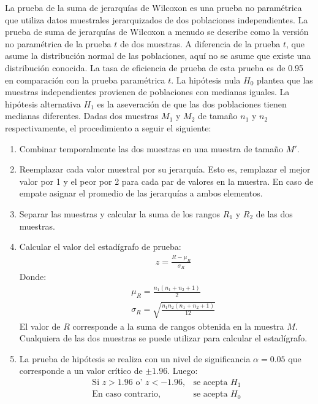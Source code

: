 La prueba de la suma de jerarquías de Wilcoxon es una prueba no paramétrica que utiliza  datos muestrales jerarquizados de dos poblaciones independientes. La prueba de suma de jerarquías de Wilcoxon a menudo se describe como la versión no paramétrica de la prueba $t$ de dos muestras. A diferencia de la prueba $t$, que asume la distribución normal de las poblaciones, aquí no se asume que existe una distribución conocida. La tasa de eficiencia de prueba de esta prueba es de 0.95 en comparación con la prueba paramétrica $t$. La hipótesis nula $H_0$ plantea que las muestras independientes provienen de poblaciones con medianas iguales. La hipótesis alternativa $H_1$ es la aseveración de que las dos poblaciones tienen medianas diferentes. Dadas dos muestras $M_1$ y $M_2$ de tamaño $n_1$ y $n_2$ respectivamente, el procedimiento a seguir el siguiente:
\begin{enumerate}
	\item Combinar temporalmente las dos muestras  en una muestra de tamaño $M'$.
	\item Reemplazar cada valor muestral por su jerarquía. Esto es, remplazar el mejor valor por 1 y el peor por 2 para cada par de valores en la muestra. En caso de empate asignar el promedio de las jerarquías a ambos elementos.
	\item Separar las muestras y calcular la suma de los rangos $R_1$ y $R_2$ de las dos muestras.
	\item Calcular el valor del estadígrafo de prueba:
	\begin{eqnarray}
	&& z= \frac{R-\mu_R}{\sigma_R}
	\end{eqnarray}
	Donde:
	\begin{eqnarray}
	&& \mu_R=\frac{n_1(n_1+n_2+1)}{2}\\
	&& \sigma_R= \sqrt{\frac{n_1n_2(n_1+n_2+1)}{12}}
	\end{eqnarray}
	El valor de $R$ corresponde a la suma de rangos obtenida en la muestra $M$. Cualquiera de las dos muestras se puede utilizar para calcular el estadígrafo. 
	\item La prueba de hipótesis se realiza con un nivel de significancia $\alpha=0.05$ que corresponde a un valor crítico de $\pm 1.96$. Luego:
	\begin{eqnarray}
	\text{Si } z > 1.96 \text{  o'  } z < -1.96,& \text{se acepta } H_1\\
	\text{En caso contrario}  ,& \text{se acepta } H_0
	\end{eqnarray}
\end{enumerate}



